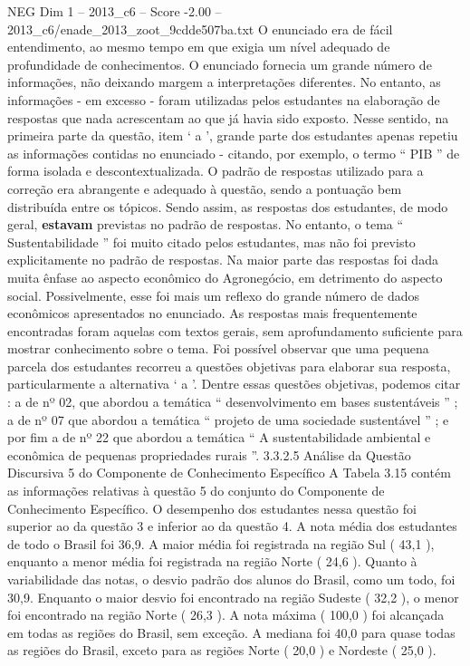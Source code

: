 \begin{textsample}{NEG Dim 1 – 2013\_c6 – Score -2.00 – 2013\_c6/enade\_2013\_zoot\_9cdde507ba.txt}
O enunciado era de fácil entendimento, ao mesmo tempo em que exigia um nível adequado de profundidade de conhecimentos.
O enunciado fornecia um grande número de informações, não deixando margem a interpretações diferentes.
No entanto, as informações - em excesso - foram utilizadas pelos estudantes na elaboração de respostas que nada acrescentam ao que já havia sido exposto.
Nesse sentido, na primeira parte da questão, item ‘ a ’, grande parte dos estudantes apenas repetiu as informações contidas no enunciado - citando, por exemplo, o termo “ PIB ” de forma isolada e descontextualizada.
O padrão de respostas utilizado para a correção era abrangente e adequado à questão, sendo a pontuação bem distribuída entre os tópicos.
Sendo assim, as respostas dos estudantes, de modo geral, \textbf{estavam} previstas no padrão de respostas.
No entanto, o tema “ Sustentabilidade ” foi muito citado pelos estudantes, mas não foi previsto explicitamente no padrão de respostas.
Na maior parte das respostas foi dada muita ênfase ao aspecto econômico do Agronegócio, em detrimento do aspecto social.
Possivelmente, esse foi mais um reflexo do grande número de dados econômicos apresentados no enunciado.
As respostas mais frequentemente encontradas foram aquelas com textos gerais, sem aprofundamento suficiente para mostrar conhecimento sobre o tema.
Foi possível observar que uma pequena parcela dos estudantes recorreu a questões objetivas para elaborar sua resposta, particularmente a alternativa ‘ a ’.
Dentre essas questões objetivas, podemos citar : a de nº 02, que abordou a temática “ desenvolvimento em bases sustentáveis ” ; a de nº 07 que abordou a temática “ projeto de uma sociedade sustentável ” ; e por fim a de nº 22 que abordou a temática “ A sustentabilidade ambiental e econômica de pequenas propriedades rurais ”. 3.3.2.5 Análise da Questão Discursiva 5 do Componente de Conhecimento Específico A Tabela 3.15 contém as informações relativas à questão 5 do conjunto do Componente de Conhecimento Específico.
O desempenho dos estudantes nessa questão foi superior ao da questão 3 e inferior ao da questão 4.
A nota média dos estudantes de todo o Brasil foi 36,9.
A maior média foi registrada na região Sul ( 43,1 ), enquanto a menor média foi registrada na região Norte ( 24,6 ).
Quanto à variabilidade das notas, o desvio padrão dos alunos do Brasil, como um todo, foi 30,9.
Enquanto o maior desvio foi encontrado na região Sudeste ( 32,2 ), o menor foi encontrado na região Norte ( 26,3 ).
A nota máxima ( 100,0 ) foi alcançada em todas as regiões do Brasil, sem exceção.
A mediana foi 40,0 para quase todas as regiões do Brasil, exceto para as regiões Norte ( 20,0 ) e Nordeste ( 25,0 ).

\end{textsample}
